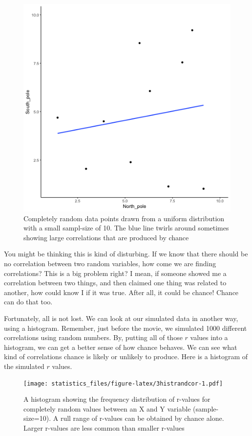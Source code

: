 \documentclass[]{book}
\begin{document}
\begin{figure}
\centering
\includegraphics{gifs/corUnifn10-1.gif}
\caption{\label{fig:3randcor10gif}Completely random data points drawn from a uniform distribution with a small sampl-size of 10. The blue line twirls around sometimes showing large correlations that are produced by chance}
\end{figure}

You might be thinking this is kind of disturbing. If we know that there should be no correlation between two random variables, how come we are finding correlations? This is a big problem right? I mean, if someone showed me a correlation between two things, and then claimed one thing was related to another, how could know I if it was true. After all, it could be chance! Chance can do that too.

Fortunately, all is not lost. We can look at our simulated data in another way, using a histogram. Remember, just before the movie, we simulated 1000 different correlations using random numbers. By, putting all of those \(r\) values into a histogram, we can get a better sense of how chance behaves. We can see what kind of correlations chance is likely or unlikely to produce. Here is a histogram of the simulated \(r\) values.

\begin{figure}
\centering
\texttt{[image: statistics\_files/figure-latex/3histrandcor-1.pdf]}
\caption{\label{fig:3histrandcor}A histogram showing the frequency distribution of r-values for completely random values between an X and Y variable (sample-size=10). A rull range of r-values can be obtained by chance alone. Larger r-values are less common than smaller r-values}
\end{figure}
\end{document}
